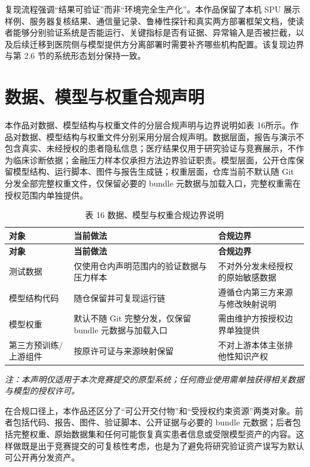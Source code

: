 复现流程强调“结果可验证”而非“环境完全生产化”。本作品保留了本机 SPU 展示样例、服务器复核结果、通信量记录、鲁棒性探针和真实两方部署框架文档，使读者能够分别验证系统是否能运行、关键指标是否有证据、异常输入是否被拦截，以及后续迁移到医院侧与模型提供方分离部署时需要补齐哪些机构配置。该复现边界与第 2.6 节的系统形态划分保持一致。

\section{数据、模型与权重合规声明}

本作品对数据、模型结构与权重文件的分层合规声明与边界说明如表 16所示。作品对数据、模型结构与权重文件分别采用分层合规声明。数据层面，报告与演示不包含真实、未经授权的患者隐私信息；医疗结果仅用于研究验证与竞赛展示，不作为临床诊断依据；金融压力样本仅承担方法边界验证职责。模型层面，公开仓库保留模型结构、运行脚本、图件与报告生成链；权重层面，仓库当前不默认随 Git 分发全部完整权重文件，仅保留必要的 bundle 元数据与加载入口，完整权重需在授权范围内单独提供。

\begin{longtable}{>{\raggedright\arraybackslash}p{}>{\raggedright\arraybackslash}p{}>{\raggedright\arraybackslash}p{}}
\caption{表 16 数据、模型与权重合规边界说明}\\
\toprule
\textbf{对象} & \textbf{当前做法} & \textbf{合规边界} \\
\midrule
\endfirsthead
\toprule
\textbf{对象} & \textbf{当前做法} & \textbf{合规边界} \\
\midrule
\endhead
测试数据 & 仅使用仓内声明范围内的验证数据与压力样本 & 不对外分发未经授权的原始敏感数据 \\
模型结构代码 & 随仓保留并可复现运行链 & 遵循仓内第三方来源与修改映射说明 \\
模型权重 & 默认不随 Git 完整分发，仅保留 bundle 元数据与加载入口 & 需由维护方按授权边界单独提供 \\
第三方预训练/上游组件 & 按原许可证与来源映射保留 & 不对上游本体主张排他性知识产权 \\
\bottomrule
\end{longtable}

\noindent\textit{注：本声明仅适用于本次竞赛提交的原型系统；任何商业使用需单独获得相关数据与模型的授权许可。}

在合规口径上，本作品还区分了“可公开交付物”和“受授权约束资源”两类对象。前者包括代码、报告、图件、验证脚本、公开证据与必要的 bundle 元数据；后者包括完整权重、原始数据集和任何可能恢复真实患者信息或受限模型资产的内容。这样做既是出于竞赛提交的可复核性考虑，也是为了避免将研究验证资产误写为默认可公开再分发资产。

